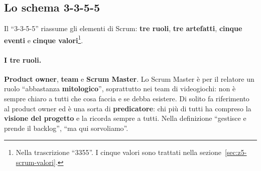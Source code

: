 \subsection{Lo schema 3-3-5-5}

Il ``3-3-5-5'' riassume gli elementi di Scrum: \textbf{tre ruoli}, \textbf{tre
artefatti}, \textbf{cinque eventi} e \textbf{cinque valori}\footnote{Nella
trascrizione ``3355''. I cinque valori sono trattati nella
sezione~\ref{sec:z5-scrum-valori}.}.

\paragraph{I tre ruoli.} \textbf{Product owner}, \textbf{team} e \textbf{Scrum
Master}. Lo Scrum Master è per il relatore un ruolo ``abbastanza
\textbf{mitologico}'', soprattutto nei team di videogiochi: non è sempre chiaro a
tutti che cosa faccia e se debba esistere. Di solito fa riferimento al product
owner ed è una sorta di \textbf{predicatore}: chi più di tutti ha compreso la
\textbf{visione del progetto} e la ricorda sempre a tutti. Nella definizione
``gestisce e prende il backlog'', ``ma qui sorvoliamo''.

